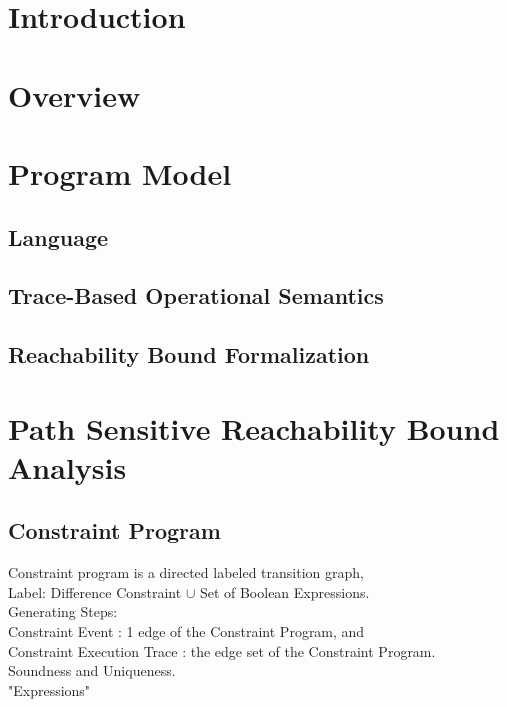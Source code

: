 \documentclass[sigplan,10pt,review,anonymous]{acmart}
\begin{document}


\maketitle


\section{Introduction}
\label{sec:intro}

\section{Overview}
\label{sec:overview}

\section{{Program Model}}
\label{sec:language}
\subsection{Language}
\subsection{Trace-Based Operational Semantics}
% 
\subsection{{Reachability Bound Formalization}}
\label{sec:execution_rb}
% 
\section{Path Sensitive Reachability Bound Analysis}
\label{sec:static_rb}
% 
\subsection{Constraint Program}
Constraint program is a directed labeled transition graph,
\\
Label: Difference Constraint $\cup$ Set of Boolean Expressions.
\\
Generating Steps: 
\\
Constraint Event : 1 edge of the Constraint Program, and 
\\
Constraint Execution Trace : the edge set of the Constraint Program.
\\
Soundness and Uniqueness.
\\
"Expressions"
\end{document}
